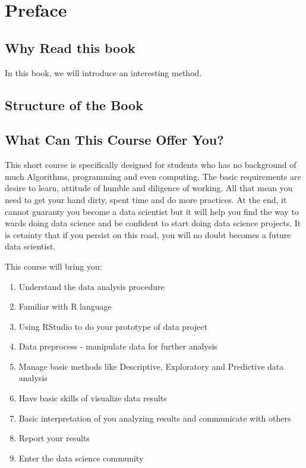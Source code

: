 \documentclass[
]{book}
\providecommand{\tightlist}{%
  \setlength{\itemsep}{0pt}\setlength{\parskip}{0pt}}
\begin{document}
\hypertarget{preface}{%
\chapter*{Preface}\label{preface}}


\hypertarget{why-read-this-book}{%
\section{Why Read this book}\label{why-read-this-book}}

In this book, we will introduce an interesting method.

\hypertarget{structure-of-the-book}{%
\section{Structure of the Book}\label{structure-of-the-book}}

\hypertarget{what-can-this-course-offer-you}{%
\section{What Can This Course Offer You?}\label{what-can-this-course-offer-you}}

This short course is specifically designed for students who has no background of much Algorithms, programming and even computing. The basic requirements are desire to learn, attitude of humble and diligence of working. All that mean you need to get your hand dirty, spent time and do more practices. At the end, it cannot guaranty you become a data scientist but it will help you find the way to wards doing data science and be confident to start doing data science projects. It is cetainty that if you persist on this road, you will no doubt becomes a future data scientist.

This course will bring you:

\begin{enumerate}
\def\labelenumi{\arabic{enumi}.}
\tightlist
\item
  Understand the data analysis procedure
\item
  Familiar with R language
\item
  Using RStudio to do your prototype of data project
\item
  Data preprocess - manipulate data for further analysis
\item
  Manage basic methods like Descriptive, Exploratory and Predictive data analysis
\item
  Have basic skills of visualize data results
\item
  Basic interpretation of you analyzing results and communicate with others
\item
  Report your results
\item
  Enter the data science community
\end{enumerate}
\end{document}
